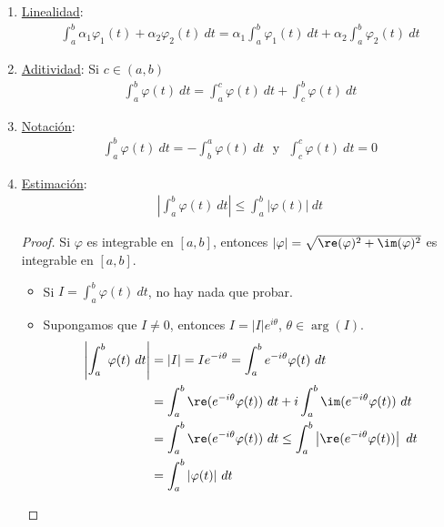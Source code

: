 \begin{obs}
\begin{enumerate}
    \item \underline{Linealidad}:
    \begin{align*}
        \int_{a}^{b}{\alpha_1\varphi_1(t) + \alpha_2\varphi_2(t) \ dt} = \alpha_1\int_{a}^{b}{\varphi_1(t) \ dt} + \alpha_2\int_{a}^{b}{\varphi_2(t) \ dt}
    \end{align*}
    \item \underline{Aditividad}: Si $c \in (a,b)$
    \begin{align*}
        \int_{a}^{b}{\varphi(t) \ dt} = \int_{a}^{c}{\varphi(t) \ dt} + \int_{c}^{b}{\varphi(t) \ dt}
    \end{align*}
    \item \underline{Notación}:
    \begin{align*}
        \int_{a}^{b}{\varphi(t) \ dt} = -\int_{b}^{a}{\varphi(t) \ dt} \ \ \ \text{y} \ \ \
        \int_{c}^{c}{\varphi(t) \ dt} = 0
    \end{align*}
    \item \underline{Estimación}:
    \begin{align*}
        \left| \int_{a}^{b}{\varphi(t) \ dt} \right| \leq \int_{a}^{b}{|\varphi(t)| \ dt}
    \end{align*}
    \begin{proof}
    Si $\varphi$ es integrable en $[a,b]$, entonces $|\varphi| = \sqrt{\re(\varphi)^2 + \im(\varphi)^2}$ es integrable en $[a,b]$.
    \begin{itemize}
        \item Si $I = \int_{a}^{b}{\varphi(t) \ dt}$, no hay nada que probar.
        \item Supongamos que $I \not = 0$, entonces $I = |I|e^{i\theta}$, $\theta \in \arg (I)$.
        \begin{align*}
             \left| \int_{a}^{b}{\varphi(t) \ dt} \right| &= |I| = Ie^{-i\theta} = \int_{a}^{b}{e^{-i\theta}\varphi(t) \ dt} \\
             &= \int_{a}^{b}{\re(e^{-i\theta}\varphi(t)) \ dt} + i\int_{a}^{b}{\im(e^{-i\theta}\varphi(t)) \ dt} \\
             &= \int_{a}^{b}{\re(e^{-i\theta}\varphi(t)) \ dt} \leq \int_{a}^{b}{\left|\re(e^{-i\theta}\varphi(t))\right| \ dt} \\
             &= \int_{a}^{b}{|\varphi(t)| \ dt}
        \end{align*}
    \end{itemize}
    \end{proof}

\end{enumerate}
\end{obs}
